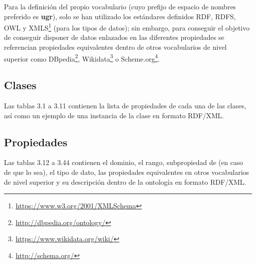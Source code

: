 Para la definición del propio vocabulario (cuyo prefijo de espacio de nombres preferido es \textbf{ugr}), solo se han utilizado los estándares definidos RDF, RDFS, OWL y XMLS\footnote{\url{https://www.w3.org/2001/XMLSchema}} (para los tipos de datos); sin embargo, para conseguir el objetivo de conseguir disponer de datos enlazados en las diferentes propiedades se referencian propiedades equivalentes dentro de otros vocabularios de nivel superior como DBpedia\footnote{\url{http://dbpedia.org/ontology/}}, Wikidata\footnote{\url{https://www.wikidata.org/wiki/}} o Scheme.org\footnote{\url{http://schema.org/}}.

\subsection{Clases}

Las tablas 3.1 a 3.11 contienen la lista de propiedades de cada una de las clases, así como un ejemplo de una instancia de la clase en formato RDF/XML. 

\subsection{Propiedades}

Las tablas 3.12 a 3.44 contienen el dominio, el rango, subpropiedad de (en caso de que lo sea), el tipo de dato, las propiedades equivalentes en otros vocabularios de nivel superior y su descripción dentro de la ontología en formato RDF/XML.

